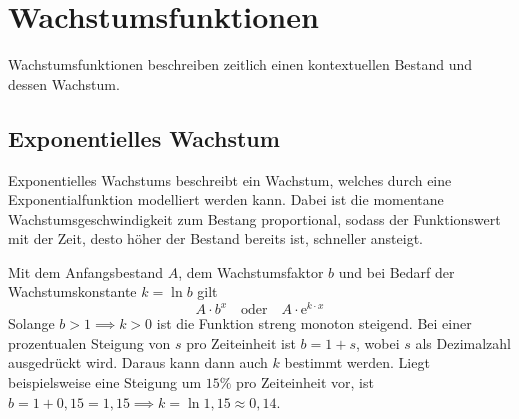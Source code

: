 \documentclass{article}
\begin{document}
 
\section{Wachstumsfunktionen}
Wachstumsfunktionen beschreiben zeitlich einen kontextuellen Bestand und dessen Wachstum.
\subsection{Exponentielles Wachstum}
Exponentielles Wachstums beschreibt ein Wachstum, welches durch eine Exponentialfunktion modelliert werden kann. Dabei ist die momentane Wachstumsgeschwindigkeit zum Bestang proportional, sodass der Funktionswert mit der Zeit, desto höher der Bestand bereits ist, schneller ansteigt.
 
\noindent \begin{minipage}{5cm}
  \centering
\end{minipage}
\hfill
\begin{minipage}{\dimexpr\textwidth-5cm}
Mit dem Anfangsbestand $A$, dem Wachstumsfaktor $b$ und bei Bedarf der Wachstumskonstante $k=\ln{b}$ gilt
\[ 
 A \cdot b^x 
 \quad \text{oder} \quad 
 A \cdot \mathrm{e}^{k \cdot x}  
\] 
Solange ${b > 1 \implies k > 0}$ ist die Funktion streng monoton steigend. Bei einer prozentualen Steigung von $s$ pro Zeiteinheit ist ${b=1+s}$, wobei $s$ als Dezimalzahl ausgedrückt wird. Daraus kann dann auch $k$ bestimmt werden. \newline
Liegt beispielsweise eine Steigung um $15\%$ pro Zeiteinheit vor, ist ${b=1 + 0,15=1,15 \implies k=\ln{1,15} \approx 0,14}$. 
\end{minipage}
 
\end{document}
